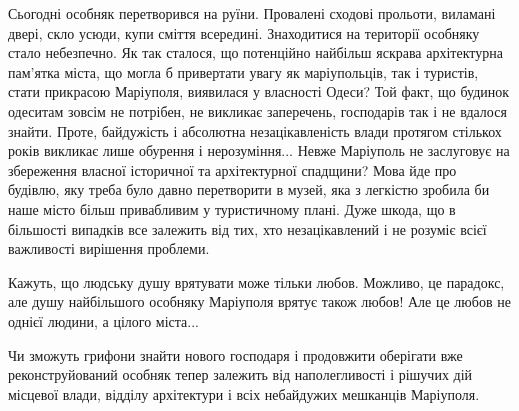 Сьогодні особняк перетворився на руїни. Провалені сходові прольоти, виламані
двері, скло усюди, купи сміття всередині. Знаходитися на території особняку
стало небезпечно. Як так сталося, що потенційно найбільш яскрава архітектурна
пам'ятка міста, що могла б привертати увагу як маріупольців, так і туристів,
стати прикрасою Маріуполя, виявилася у власності Одеси? Той факт, що будинок
одеситам зовсім не потрібен, не викликає заперечень, господарів так і не
вдалося знайти. Проте, байдужість і абсолютна незацікавленість влади протягом
стількох років викликає лише обурення і нерозуміння... Невже Маріуполь не
заслуговує на збереження власної історичної та архітектурної спадщини? Мова йде
про будівлю, яку треба було давно перетворити в музей, яка з легкістю зробила
би наше місто більш привабливим у туристичному плані. Дуже шкода, що в
більшості випадків все залежить від тих, хто незацікавлений і не розуміє всієї
важливості вирішення проблеми.

Кажуть, що людську душу врятувати може тільки любов. Можливо, це парадокс, але
душу найбільшого особняку Маріуполя врятує також любов! Але це любов не однієї
людини, а цілого міста...

Чи зможуть грифони знайти нового господаря і продовжити оберігати вже
реконструйований особняк тепер залежить від наполегливості і рішучих дій
місцевої влади, відділу архітектури і всіх небайдужих мешканців Маріуполя.

